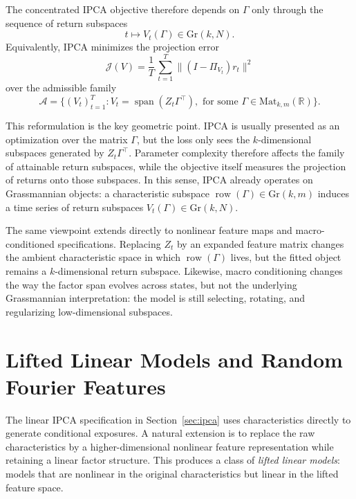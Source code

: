 \documentclass[11pt,letterpaper]{article}
\newcommand{\gr}{\mathrm{Gr}}
\newcommand{\bR}{\mathbb{R}}
\newcommand{\cA}{\mathcal{A}}
\newcommand{\cJ}{\mathcal{J}}
\begin{document}
The concentrated IPCA objective therefore depends on $\Gamma$ only through the sequence of return subspaces
\begin{equation*}
t\longmapsto V_t(\Gamma)\in \gr(k,N).
\end{equation*}
Equivalently, IPCA minimizes the projection error
\begin{equation*}
\cJ(V)=\frac{1}{T}\,\sum_{t=1}^T\|(I-\Pi_{V_t})r_t\|^2
\end{equation*}
over the admissible family
\begin{equation*}
\cA=\big\{(V_t)_{t=1}^T:V_t=\operatorname{span}(Z_t\Gamma^\top),\text{ for some } \Gamma\in\mathrm{Mat}_{k,m}(\bR)\big\}.
\end{equation*}

This reformulation is the key geometric point. IPCA is usually presented as an optimization over the matrix $\Gamma$, but the loss only sees the $k$-dimensional subspaces generated by $Z_t\Gamma^\top$. Parameter complexity therefore affects the family of attainable return subspaces, while the objective itself measures the projection of returns onto those subspaces. In this sense, IPCA already operates on Grassmannian objects: a characteristic subspace $\operatorname{row}(\Gamma)\in\gr(k,m)$ induces a time series of return subspaces $V_t(\Gamma)\in\gr(k,N)$.

The same viewpoint extends directly to nonlinear feature maps and macro-conditioned specifications. Replacing $Z_t$ by an expanded feature
matrix changes the ambient characteristic space in which $\operatorname{row}(\Gamma)$ lives, but the fitted object remains a $k$-dimensional return subspace. Likewise, macro conditioning \cite{LM26} changes the way the factor span evolves across states, but not the underlying Grassmannian interpretation: the model is still selecting, rotating, and regularizing low-dimensional subspaces.

\section{Lifted Linear Models and Random Fourier Features}
\label{sec:rff}

The linear IPCA specification in Section~\ref{sec:ipca} uses characteristics directly to generate conditional exposures. A natural extension is to replace the raw characteristics by a higher-dimensional nonlinear feature representation while retaining a linear factor structure. This produces a class of \emph{lifted linear models}: models that are nonlinear in the original characteristics but linear in the lifted feature space.
\end{document}
